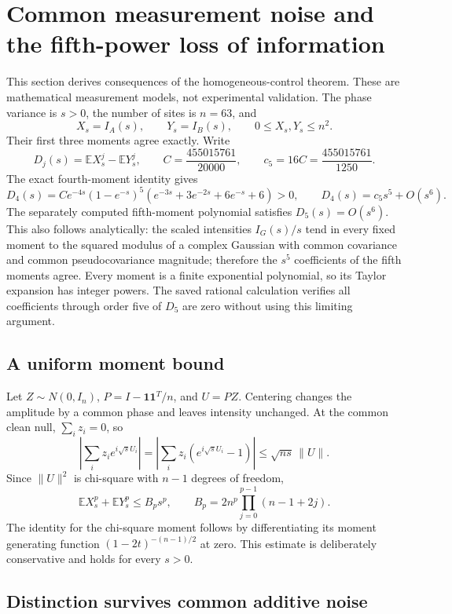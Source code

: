 \section{Common measurement noise and the fifth-power loss of information}
\label{sec:detectors}

This section derives consequences of the homogeneous-control theorem. These
are mathematical measurement models, not experimental validation. The phase
variance is $s>0$, the number of sites is $n=63$, and
\[
 X_s=I_A(s),\qquad Y_s=I_B(s),\qquad 0\le X_s,Y_s\le n^2.
\]
Their first three moments agree exactly. Write
\[
 D_j(s)=\mathbb E X_s^j-\mathbb E Y_s^j,\qquad
 C=\frac{455015761}{20000},\qquad c_5=16C=\frac{455015761}{1250}.
\]
The exact fourth-moment identity gives
\[
 D_4(s)=C e^{-4s}(1-e^{-s})^5
 (e^{-3s}+3e^{-2s}+6e^{-s}+6)>0,
 \qquad D_4(s)=c_5s^5+O(s^6).
\]
The separately computed fifth-moment polynomial satisfies
$D_5(s)=O(s^6)$. This also follows analytically: the scaled intensities
$I_G(s)/s$ tend in every fixed moment to the squared modulus of a complex
Gaussian with common covariance and common pseudocovariance magnitude;
therefore the $s^5$ coefficients of the fifth moments agree. Every moment
is a finite exponential polynomial, so its Taylor expansion has integer
powers. The saved rational calculation verifies all coefficients through
order five of $D_5$ are zero without using this limiting argument.

\subsection{A uniform moment bound}

Let $Z\sim N(0,I_n)$, $P=I-\mathbf1\mathbf1^T/n$, and $U=PZ$.
Centering changes the amplitude by a common phase and leaves intensity
unchanged. At the common clean null, $\sum_i z_i=0$, so
\[
 \left|\sum_i z_i e^{i\sqrt{s}U_i}\right|
 =\left|\sum_i z_i(e^{i\sqrt{s}U_i}-1)\right|
 \le\sqrt{ns}\,\|U\|.
\]
Since $\|U\|^2$ is chi-square with $n-1$ degrees of freedom,
\begin{equation}\label{eq:Bp}
 \mathbb E X_s^p+\mathbb E Y_s^p\le B_p s^p,
 \qquad B_p=2n^p\prod_{j=0}^{p-1}(n-1+2j).
\end{equation}
The identity for the chi-square moment follows by differentiating its
moment generating function $(1-2t)^{-(n-1)/2}$ at zero. This estimate is
deliberately conservative and holds for every $s>0$.

\subsection{Distinction survives common additive noise}

